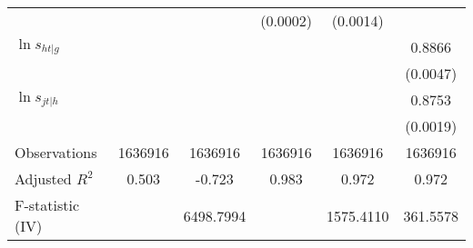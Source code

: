 \begin{table}[htbp]
\begin{tabular}{l*{5}{c}}
                    &                     &                     &    (0.0002)         &    (0.0014)         &                     \\
\addlinespace
$\ln s_{ht|g}$      &                     &                     &                     &                     &      0.8866\sym{***}\\
                    &                     &                     &                     &                     &    (0.0047)         \\
\addlinespace
$\ln s_{jt|h}$      &                     &                     &                     &                     &      0.8753\sym{***}\\
                    &                     &                     &                     &                     &    (0.0019)         \\
\midrule
Observations        &     1636916         &     1636916         &     1636916         &     1636916         &     1636916         \\
Adjusted \(R^{2}\)  &       0.503         &      -0.723         &       0.983         &       0.972         &       0.972         \\
F-statistic (IV)    &                     &   6498.7994         &                     &   1575.4110         &    361.5578         \\
\bottomrule
\end{tabular}
\end{table}
